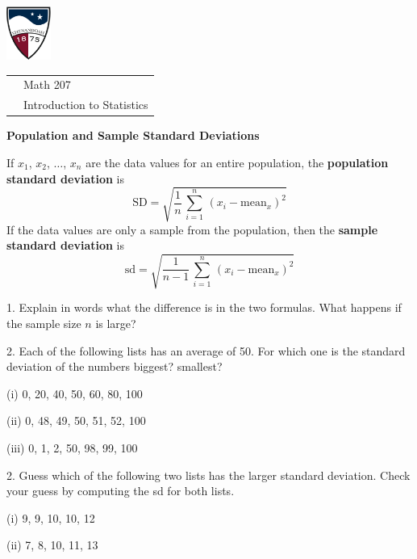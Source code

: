 \documentclass[10pt]{article}
\begin{document}
\pagestyle{empty}

\href{http://www.su.edu}{\includegraphics[height=1.75cm]{sulogo.eps}}
\vspace{-1.69cm}

{\small\hfill
\begin{tabular}{cl}
 & Math 207\\ &  Introduction to Statistics\\
\end{tabular}

\begin{center}
\textbf{\large Population and Sample Standard Deviations}
\end{center}

If $x_1$, $x_2$, $\dots$, $x_n$ are the data values for an entire population, 
the \textbf{population standard deviation} is 
\[\mbox{SD} = \sqrt{\frac{1}{n}\,\sum_{i=1}^n\,\left(x_i - \mbox{mean}_x\right)^2}\]
If the data values are only a sample from the population, then the
\textbf{sample standard deviation} is
\[\mbox{sd} = \sqrt{\frac{1}{n-1}\,\sum_{i=1}^n\,\left(x_i - \mbox{mean}_x\right)^2}\]
\bigskip

1. Explain in words what the difference is in the two formulas.  What happens if the sample
size $n$ is large?
\vspace{1in}

2. Each of the following lists has an average of 50.  For which one is the 
standard deviation of the numbers biggest?  smallest?

\hspace{5pt} (i)\hphantom{ii}  0, 20, 40, 50, 60, 80, 100\medskip

\hspace{5pt} (ii)\hphantom{i}  0, 48, 49, 50, 51, 52, 100\medskip

\hspace{5pt} (iii)             0, 1, 2, 50, 98, 99, 100
\bigskip


2. Guess which of the following two lists has the larger standard deviation.  Check your guess by 
computing the sd for both lists.

\hspace{5pt} (i)\hphantom{i} 9, 9, 10, 10, 12\medskip

\hspace{5pt} (ii)            7, 8, 10, 11, 13
\vfill
\eject

}
\end{document}

